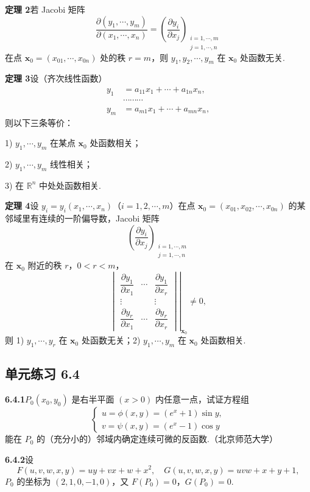\documentclass[UTF8, 12pt, fontset=fandol, oneside]{ctexart}
\begin{document}
\noindent\textbf{定理 2}\quad 若 Jacobi 矩阵
\[
  \frac{\partial(y_1,\cdots,y_m)}{\partial(x_1,\cdots,x_n)}
  =
  \left(\frac{\partial y_i}{\partial x_j}\right)_
  {\substack{i=1,\cdots,m\\ j=1,\cdots,n}}
\]
在点 $\mathbf x_0=(x_{01},\cdots,x_{0n})$ 处的秩 $r=m$，则
$y_1,y_2,\cdots,y_m$ 在 $\mathbf x_0$ 处函数无关.

\noindent\textbf{定理 3}\quad 设（齐次线性函数）
\[
\begin{aligned}
  y_1&=a_{11}x_1+\cdots+a_{1n}x_n,\\
  &\cdots\cdots\cdots\\
  y_m&=a_{m1}x_1+\cdots+a_{mn}x_n,
\end{aligned}
\]
则以下三条等价：

1) $y_1,\cdots,y_m$ 在某点 $\mathbf x_0$ 处函数相关；

2) $y_1,\cdots,y_m$ 线性相关；

3) 在 $\mathbb R^n$ 中处处函数相关.

\noindent\textbf{定理 4}\quad 设 $y_i=y_i(x_1,\cdots,x_n)$（$i=1,2,\cdots,m$）在点
$\mathbf x_0=(x_{01},x_{02},\cdots,x_{0n})$ 的某邻域里有连续的一阶偏导数，Jacobi 矩阵
\[
  \left(\frac{\partial y_i}{\partial x_j}\right)_
  {\substack{i=1,\cdots,m\\ j=1,\cdots,n}}
\]
在 $\mathbf x_0$ 附近的秩 $r$，$0<r<m$，
\[
\left.
\begin{vmatrix}
  \dfrac{\partial y_1}{\partial x_1} & \cdots & \dfrac{\partial y_1}{\partial x_r}\\
  \vdots & & \vdots\\
  \dfrac{\partial y_r}{\partial x_1} & \cdots & \dfrac{\partial y_r}{\partial x_r}
\end{vmatrix}
\right|_{\mathbf x_0}
\ne0,
\]
则 1) $y_1,\cdots,y_r$ 在 $\mathbf x_0$ 处函数无关；2) $y_1,\cdots,y_m$ 在 $\mathbf x_0$ 处函数相关.

\subsection*{单元练习 6.4}

\noindent\textbf{6.4.1}\quad $P_0(x_0,y_0)$ 是右半平面 $(x>0)$ 内任意一点，试证方程组
\[
\begin{cases}
  u=\phi(x,y)=(e^x+1)\sin y,\\
  v=\psi(x,y)=(e^x-1)\cos y
\end{cases}
\]
能在 $P_0$ 的（充分小的）邻域内确定连续可微的反函数.（北京师范大学）

\noindent\textbf{6.4.2}\quad 设
\[
  F(u,v,w,x,y)=uy+vx+w+x^2,\quad
  G(u,v,w,x,y)=uvw+x+y+1,
\]
$P_0$ 的坐标为 $(2,1,0,-1,0)$，又 $F(P_0)=0$，$G(P_0)=0$.
\end{document}
